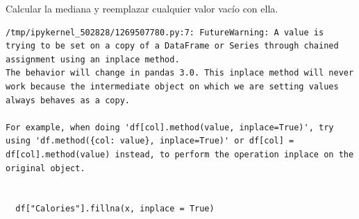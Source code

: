 \begin{code} Calcular la mediana y reemplazar cualquier valor vacío con ella.

\begin{Shaded}
\begin{Highlighting}[]

\OperatorTok{=}\NormalTok{)}

\OperatorTok{=}\NormalTok{ df[}\NormalTok{].median()}

\NormalTok{df[}\NormalTok{].fillna(x, inplace }\OperatorTok{=} \NormalTok{)}
\end{Highlighting}
\end{Shaded}

\begin{verbatim}
/tmp/ipykernel_502828/1269507780.py:7: FutureWarning: A value is trying to be set on a copy of a DataFrame or Series through chained assignment using an inplace method.
The behavior will change in pandas 3.0. This inplace method will never work because the intermediate object on which we are setting values always behaves as a copy.

For example, when doing 'df[col].method(value, inplace=True)', try using 'df.method({col: value}, inplace=True)' or df[col] = df[col].method(value) instead, to perform the operation inplace on the original object.


  df["Calories"].fillna(x, inplace = True)

\end{verbatim}
\end{code}

